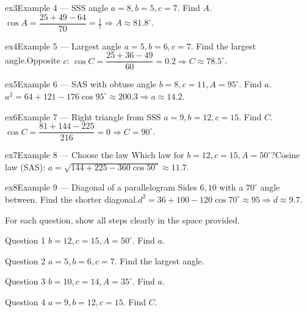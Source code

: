 \documentclass[11pt]{article}
\begin{document}
\begin{example}{ex3}{Example 4 --- SSS angle}
$a=8,b=5,c=7$. Find $A$.\soln $\cos A=\dfrac{25+49-64}{70}=\tfrac17\Rightarrow A\approx81.8^\circ$.
\end{example}

\begin{example}{ex4}{Example 5 --- Largest angle}
$a=5,b=6,c=7$. Find the largest angle.\soln Opposite $c$: $\cos C=\dfrac{25+36-49}{60}=0.2\Rightarrow C\approx78.5^\circ$.
\end{example}

\begin{example}{ex5}{Example 6 --- SAS with obtuse angle}
$b=8,c=11,A=95^\circ$. Find $a$.\soln $a^2=64+121-176\cos95^\circ\approx200.3\Rightarrow a\approx14.2$.
\end{example}

\begin{example}{ex6}{Example 7 --- Right triangle from SSS}
$a=9,b=12,c=15$. Find $C$.\soln $\cos C=\dfrac{81+144-225}{216}=0\Rightarrow C=90^\circ$.
\end{example}

\begin{example}{ex7}{Example 8 --- Choose the law}
Which law for $b=12,c=15,A=50^\circ$?\soln Cosine law (SAS): $a=\sqrt{144+225-360\cos50^\circ}\approx11.7$.
\end{example}

\begin{example}{ex8}{Example 9 --- Diagonal of a parallelogram}
Sides $6,10$ with a $70^\circ$ angle between. Find the shorter diagonal.\soln $d^2=36+100-120\cos70^\circ\approx95\Rightarrow d\approx9.7$.
\end{example}

\clearpage
{}
For each question, show all steps clearly in the space provided.

\begin{qbox}{Question 1}
$b=12,c=15,A=50^\circ$. Find $a$.\workspace{2.4cm}
\end{qbox}

\begin{qbox}{Question 2}
$a=5,b=6,c=7$. Find the largest angle.\workspace{2.4cm}
\end{qbox}

\begin{qbox}{Question 3}
$b=10,c=14,A=35^\circ$. Find $a$.\workspace{2.4cm}
\end{qbox}

\begin{qbox}{Question 4}
$a=9,b=12,c=15$. Find $C$.\workspace{2.4cm}
\end{qbox}
\end{document}
